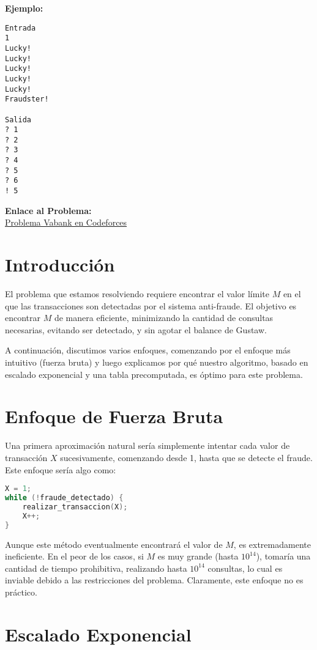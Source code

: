 \documentclass{article}
\begin{document}
\textbf{Ejemplo:}
\begin{verbatim}
Entrada
1
Lucky!
Lucky!
Lucky!
Lucky!
Lucky!
Fraudster!

Salida
? 1
? 2
? 3
? 4
? 5
? 6
! 5
\end{verbatim}

\textbf{Enlace al Problema:} \\
\href{https://codeforces.com/contest/1482/problem/G}{Problema Vabank en Codeforces}
\section{Introducción}

El problema que estamos resolviendo requiere encontrar el valor límite $M$ en el que las transacciones son detectadas por el sistema anti-fraude. El objetivo es encontrar $M$ de manera eficiente, minimizando la cantidad de consultas necesarias, evitando ser detectado, y sin agotar el balance de Gustaw.

A continuación, discutimos varios enfoques, comenzando por el enfoque más intuitivo (fuerza bruta) y luego explicamos por qué nuestro algoritmo, basado en escalado exponencial y una tabla precomputada, es óptimo para este problema.

\section{Enfoque de Fuerza Bruta}

Una primera aproximación natural sería simplemente intentar cada valor de transacción $X$ sucesivamente, comenzando desde 1, hasta que se detecte el fraude. Este enfoque sería algo como:

\begin{lstlisting}[language=C]
X = 1;
while (!fraude_detectado) {
    realizar_transaccion(X);
    X++;
}
\end{lstlisting}

Aunque este método eventualmente encontrará el valor de $M$, es extremadamente ineficiente. En el peor de los casos, si $M$ es muy grande (hasta $10^{14}$), tomaría una cantidad de tiempo prohibitiva, realizando hasta $10^{14}$ consultas, lo cual es inviable debido a las restricciones del problema. Claramente, este enfoque no es práctico.

\section{Escalado Exponencial}
\end{document}
